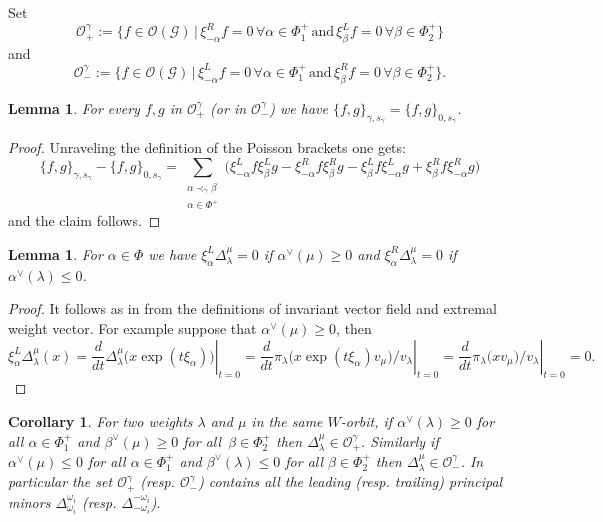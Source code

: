 \documentclass[a4paper]{amsart}
\newtheorem{corollary}[theorem]{Corollary}
\newtheorem{lemma}[theorem]{Lemma}
\theoremstyle{definition}
\newcommand{\mcO}{\mathcal{O}}
\newcommand{\mcG}{\mathcal{G}}
\begin{document}
Set 
\[
  \mcO^\gamma_+:=\Big\{f\in\mcO(\mcG)\,\Big|\, \xi_{-\alpha}^Rf=0 \,\forall \alpha\in\Phi^+_1\,\text{and}\, \xi_\beta^Lf=0 \,\forall\beta\in\Phi^+_2\Big\}
\]
and
\[
  \mcO^\gamma_-:=\Big\{f\in\mcO(\mcG)\,\Big|\, \xi_{-\alpha}^Lf=0 \,\forall \alpha\in\Phi^+_1\,\text{and}\, \xi_\beta^Rf=0 \,\forall\beta\in\Phi^+_2\Big\}.
\]

\begin{lemma}
  For every $f,g$ in $\mcO^\gamma_+$ (or in $\mcO^\gamma_-$) we have $\{f,g\}_{\gamma,s_\gamma} =\{f,g\}_{0,s_\gamma}$.
\end{lemma}

\begin{proof}
  Unraveling the definition of the Poisson brackets one gets:
  \[
    \{f,g\}_{\gamma,s_\gamma} - \{f,g\}_{0,s_\gamma}
    = 
    \sum_{\substack{\alpha\prec_\gamma\beta\\ \alpha\in\Phi^+}} \Big(\xi_{-\alpha}^L f \xi_\beta^L g - \xi_{-\alpha}^R f \xi_\beta^R g - \xi_\beta^L f \xi_{-\alpha}^L g + \xi_\beta^R f \xi_{-\alpha}^R g\Big)
  \]
  and the claim follows.
\end{proof}

\begin{lemma}
  \label{lem: derivatives of minors}
  For $\alpha\in\Phi$ we have $\xi_\alpha^L \Delta_\lambda^\mu = 0$ if $\alpha^\vee(\mu)\geq0$ and $\xi_\alpha^R \Delta_\lambda^\mu = 0$ if $\alpha^\vee(\lambda)\leq0$.
\end{lemma}
\begin{proof}
  It follows as in \cite[Lemma 2.6]{RSW17} from the definitions of invariant vector field and extremal weight vector.
  For example suppose that $\alpha^\vee(\mu) \geq 0$, then
  \[
    \xi_\alpha^L\Delta_\lambda^\mu(x)
    =
    \left.\frac{d}{dt}\Delta_\lambda^\mu\Big(x \exp(t\xi_\alpha)\Big)\right|_{t=0}
    =
    \left.\frac{d}{dt}\pi_\lambda\big(x \exp(t\xi_\alpha)v_\mu\big)/v_\lambda\right|_{t=0}
    =
    \left.\frac{d}{dt}\pi_\lambda\big(x v_\mu\big)/v_\lambda\right|_{t=0}
    =
    0.
  \]
\end{proof}

\begin{corollary}
  \label{cor: tuned}
  For two weights $\lambda$ and $\mu$ in the same $W$-orbit, if $\alpha^\vee(\lambda)\geq0$ for all $\alpha\in\Phi^+_1$ and $\beta^\vee(\mu)\geq0$ for all~$\beta\in\Phi^+_2$ then $\Delta_\lambda^\mu\in\mcO^\gamma_+$.
  Similarly if $\alpha^\vee(\mu)\leq0$ for all $\alpha\in\Phi^+_1$ and $\beta^\vee(\lambda)\leq0$ for all $\beta\in\Phi^+_2$ then $\Delta_\lambda^\mu\in\mcO^\gamma_-$.
  In particular the set $\mcO^\gamma_+$ (resp. $\mcO^\gamma_-$) contains all the leading (resp. trailing) principal minors $\Delta_{\omega_i}^{\omega_i}$ (resp. $\Delta_{-\omega_i}^{-\omega_i}$).
\end{corollary}
\end{document}
